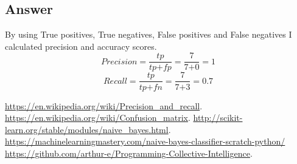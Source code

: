 \documentclass[letterpaper,11pt]{article}
\begin{document}
\subsection*{Answer}

	By using True positives, True negatives, False positives and False negatives I calculated  precision and accuracy scores.
	\[Precision 
	= \dfrac{tp}{tp\texttt{+}fp}
  	= \dfrac{7}{7\texttt{+}0}
	=1
\]
\[Recall  
 	 = \dfrac{tp}{tp\texttt{+}fn}
  	= \dfrac{7}{7\texttt{+}3}	
	=0.7
\]

\clearpage



\begin{thebibliography}{9}
\bibitem{}
\url{https://en.wikipedia.org/wiki/Precision_and_recall}.
\bibitem{}
\url{https://en.wikipedia.org/wiki/Confusion_matrix}.
\bibitem{}
 \url{http://scikit-learn.org/stable/modules/naive_bayes.html}.
\bibitem{}
\url{https://machinelearningmastery.com/naive-bayes-classifier-scratch-python/}
\bibitem{}
 \url{https://github.com/arthur-e/Programming-Collective-Intelligence}.
\end{thebibliography}
\end{document}
